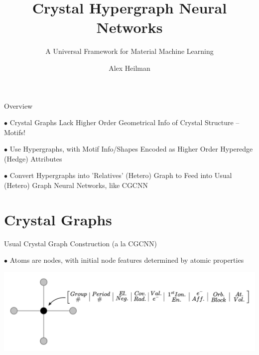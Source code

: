 \documentclass[11pt]{beamer}
\author{Alex Heilman}
\title{Crystal Hypergraph Neural Networks}
\subtitle{A Universal Framework for Material Machine Learning}
\begin{document}
\begin{frame}
\titlepage
\end{frame}


\begin{frame}{Overview}

$\bullet$ Crystal Graphs Lack Higher Order Geometrical Info of Crystal Structure \pause -- Motifs!

\vspace{.7cm}\pause

$\bullet$ Use Hypergraphs, with Motif Info/Shapes Encoded as Higher Order Hyperedge (Hedge) Attributes

\vspace{.7cm}\pause

$\bullet$ Convert Hypergraphs into 'Relatives' (Hetero) Graph  to Feed into Usual (Hetero) Graph Neural Networks, like CGCNN


\end{frame}

\section{Crystal Graphs}
\begin{frame}{Usual Crystal Graph Construction \small(a la CGCNN)}

$\bullet$ Atoms are nodes, with initial node features determined by atomic properties

\medskip

\begin{center}

\includegraphics[scale=0.3]{atom_feat.pdf}

\end{center}
\end{frame}
\end{document}

